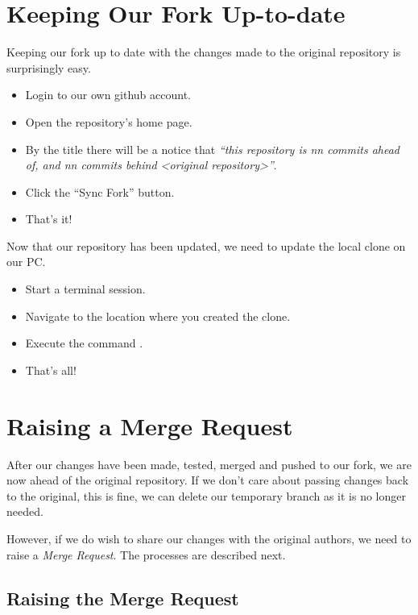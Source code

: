 \section{Keeping Our Fork Up-to-date}

Keeping our fork up to date with the changes made to the original repository is surprisingly easy.

\begin{itemize}
    \item Login to our own github account.
    \item Open the repository's home page.
    \item By the title there will be a notice that \emph{``this repository is nn commits ahead of, and nn commits behind <original repository>''}.
    \item Click the ``Sync Fork'' button.
    \item That's it!
\end{itemize}

Now that our repository has been updated, we need to update the local clone on our PC.

\begin{itemize}
    \item Start a terminal session.
    \item Navigate to the location where you created the clone.
    \item Execute the command .
    \item That's all!
\end{itemize}


\section{Raising a Merge Request}\label{sect: Raising a merge request}

After our changes have been made, tested, merged and pushed to our fork, we are now ahead of the original repository. If we don't care about passing changes back to the original, this is fine, we can delete our temporary branch as it is no longer needed.

However, if we do wish to share our changes with the original authors, we need to raise a \emph{Merge Request}. The processes are described next.

\subsection{Raising the Merge Request}

